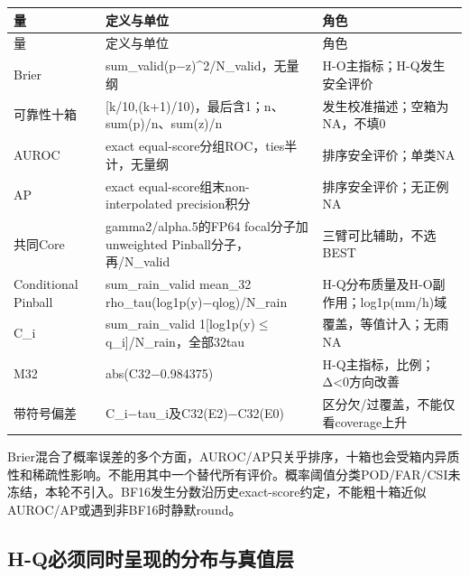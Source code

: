 \documentclass[UTF8,fontset=fandol,10pt]{ctexart}
\begin{document}
\begingroup\small\setlength{\tabcolsep}{3pt}\renewcommand{\arraystretch}{1.12}
\begin{longtable}{>{\raggedright\arraybackslash}p{\dimexpr(\linewidth-6\tabcolsep)/3\relax}>{\raggedright\arraybackslash}p{\dimexpr(\linewidth-6\tabcolsep)/3\relax}>{\raggedright\arraybackslash}p{\dimexpr(\linewidth-6\tabcolsep)/3\relax}}
\toprule
量 & 定义与单位 & 角色 \\
\midrule\endfirsthead
量 & 定义与单位 & 角色 \\
\midrule\endhead
Brier & sum\_\allowbreak{}valid(p\(-\)z)\textasciicircum{}2/\allowbreak{}N\_\allowbreak{}valid，无量纲 & H-O主指标；H-Q发生安全评价 \\
可靠性十箱 & [k/\allowbreak{}10,(k+1)/\allowbreak{}10)，最后含1；n、sum(p)/\allowbreak{}n、sum(z)/\allowbreak{}n & 发生校准描述；空箱为NA，不填0 \\
AUROC & exact equal-score分组ROC，ties半计，无量纲 & 排序安全评价；单类NA \\
AP & exact equal-score组末non-interpolated precision积分 & 排序安全评价；无正例NA \\
共同Core & gamma2/\allowbreak{}alpha.5的FP64 focal分子加unweighted Pinball分子，再/\allowbreak{}N\_\allowbreak{}valid & 三臂可比辅助，不选BEST \\
Conditional Pinball & sum\_\allowbreak{}rain\_\allowbreak{}valid mean\_\allowbreak{}32 rho\_\allowbreak{}tau(log1p(y)\(-\)qlog)/\allowbreak{}N\_\allowbreak{}rain & H-Q分布质量及H-O副作用；log1p(mm/\allowbreak{}h)域 \\
C\_\allowbreak{}i & sum\_\allowbreak{}rain\_\allowbreak{}valid 1[log1p(y)\(\le\)q\_\allowbreak{}i]/\allowbreak{}N\_\allowbreak{}rain，全部32tau & 覆盖，等值计入；无雨NA \\
M32 & abs(C32\(-\)0.984375) & H-Q主指标，比例；Δ<0方向改善 \\
带符号偏差 & C\_\allowbreak{}i\(-\)tau\_\allowbreak{}i及C32(E2)\(-\)C32(E0) & 区分欠/\allowbreak{}过覆盖，不能仅看coverage上升 \\
\bottomrule\end{longtable}\endgroup

Brier混合了概率误差的多个方面，AUROC/\allowbreak{}AP只关乎排序，十箱也会受箱内异质性和稀疏性影响。不能用其中一个替代所有评价。概率阈值分类POD/\allowbreak{}FAR/\allowbreak{}CSI未冻结，本轮不引入。BF16发生分数沿历史exact-score约定，不能粗十箱近似AUROC/\allowbreak{}AP或遇到非BF16时静默round。

\subsection{H-Q必须同时呈现的分布与真值层}
\end{document}
